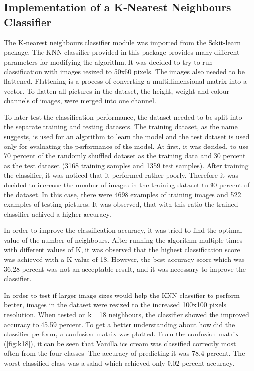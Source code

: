 \subsection{Implementation of a K-Nearest Neighbours Classifier}
 The K-nearest neighbours classifier module was imported from the Sckit-learn package. The KNN classifier provided in this package provides many different parameters for modifying the algorithm.  It was decided to try to run classification with images resized to 50x50 pixels. The images also needed to be flattened. Flattening is a process of converting a multidimensional matrix into a vector. To flatten all pictures in the dataset, the height, weight and colour channels of images, were merged into one channel.

 To later test the classification performance, the dataset needed to be split into the separate training and testing datasets. The training dataset, as the name suggests, is used for an algorithm to learn the model and the test dataset is used only for evaluating the performance of the model. At first, it was decided, to use 70 percent of the randomly shuffled dataset as the training data and 30 percent as the test dataset (3168 training samples and 1359 test samples). After training the classifier, it was noticed that it performed rather poorly. Therefore it was decided to increase the number of images in the training dataset to 90 percent of the dataset. In this case, there were 4698 examples of training images and 522 examples of testing pictures. It was observed, that with this ratio the trained classifier achived a higher accuracy.
 
 In order to improve the classification accuracy, it was tried to find the optimal value of the number of neighbours. After running the algorithm multiple times with different values of K, it was observed that the highest classification score was achieved with a K value of 18. However, the best accuracy score which was 36.28 percent was not an acceptable result, and it was necessary to improve the classifier.

  In order to test if larger image sizes would help the KNN classifier to perform better, images in the dataset were resized to the increased 100x100 pixels resolution. When tested on k= 18 neighbours, the classifier showed the improved accuracy to 45.59 percent. To get a better understanding about how did the classifier perform, a confusion matrix was plotted. From the confusion matrix (\autoref{fig:k18}), it can be seen that Vanilla ice cream was classified correctly most often from the four classes. The accuracy of predicting it was 78.4 percent. The worst classified class was a salad which achieved only 0.02 percent accuracy.


